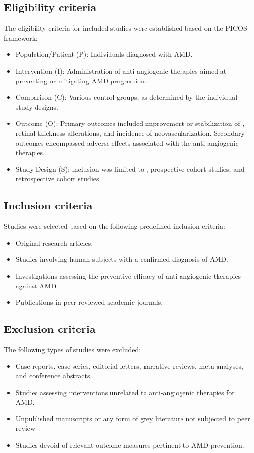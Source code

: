 \subsection{Eligibility criteria}\label{s:eligibility-criteria}
The eligibility criteria for included studies were established based on the PICOS framework:
\begin{itemize}
    \item Population/Patient (P): Individuals diagnosed with AMD.
    \item Intervention (I): Administration of anti-angiogenic therapies aimed at preventing or mitigating AMD progression.
    \item Comparison (C): Various control groups, as determined by the individual study designs.
    \item Outcome (O): Primary outcomes included improvement or stabilization of , retinal thickness alterations, and incidence of neovascularization. Secondary outcomes encompassed adverse effects associated with the anti-angiogenic therapies.
    \item Study Design (S): Inclusion was limited to \RCTs, prospective cohort studies, and retrospective cohort studies.
\end{itemize}

\subsection{Inclusion criteria}\label{s:inclusion-criteria}
Studies were selected based on the following predefined inclusion criteria:
\begin{itemize}
    \item Original research articles.
    \item Studies involving human subjects with a confirmed diagnosis of AMD.
    \item Investigations assessing the preventive efficacy of anti-angiogenic therapies against AMD.
    \item Publications in peer-reviewed academic journals.
\end{itemize}

\subsection{Exclusion criteria}\label{s:exclusion-criteria}
The following types of studies were excluded:
\begin{itemize}
    \item Case reports, case series, editorial letters, narrative reviews, meta-analyses, and conference abstracts.
    \item Studies assessing interventions unrelated to anti-angiogenic therapies for AMD.
    \item Unpublished manuscripts or any form of grey literature not subjected to peer review.
    \item Studies devoid of relevant outcome measures pertinent to AMD prevention.
\end{itemize}

